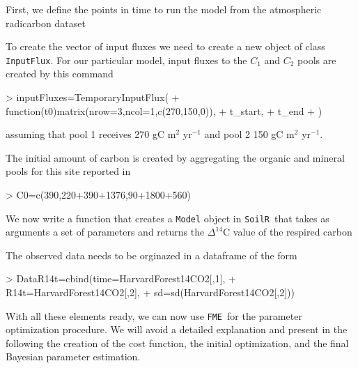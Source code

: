 \documentclass[a4paper]{article}
\newcommand{\SoilR}{\texttt{SoilR}}
\newcommand{\FME}{\texttt{FME}}
\begin{document}
First, we define the points in time to run the model from the atmospheric radicarbon dataset
\begin{Schunk}
\end{Schunk}

To create the vector of input fluxes we need to create a new object of class {\tt InputFlux}. For our particular model, input fluxes to the $C_1$ and $C_2$ pools are created by this command

\begin{Schunk}
\begin{Sinput}
> inputFluxes=TemporaryInputFlux(
+ 	function(t0){matrix(nrow=3,ncol=1,c(270,150,0))},
+ 	t_start,
+ 	t_end
+ )
\end{Sinput}
\end{Schunk}
assuming that pool 1 receives 270 gC m$^{2}$ yr$^{-1}$ and pool 2 150 gC m$^{2}$ yr$^{-1}$. 

The initial amount of carbon is created by aggregating the organic and mineral pools for this site reported in \citet{SierraBG}
\begin{Schunk}
\begin{Sinput}
> C0=c(390,220+390+1376,90+1800+560) 
\end{Sinput}
\end{Schunk}

We now write a function that creates a {\tt Model} object in \SoilR \, that takes as arguments a set of parameters and returns the 
$\Delta^{14}$C value of the respired carbon


The observed data needs to be orginazed in a dataframe of the form
\begin{Schunk}
\begin{Sinput}
> DataR14t=cbind(time=HarvardForest14CO2[,1],
+                R14t=HarvardForest14CO2[,2],
+                sd=sd(HarvardForest14CO2[,2]))
\end{Sinput}
\end{Schunk}


With all these elements ready, we can now use \FME \, for the parameter optimization procedure. We will avoid a detailed explanation and present in the following the creation of the cost function, the initial optimization, and the final Bayesian parameter estimation. 
\end{document}
